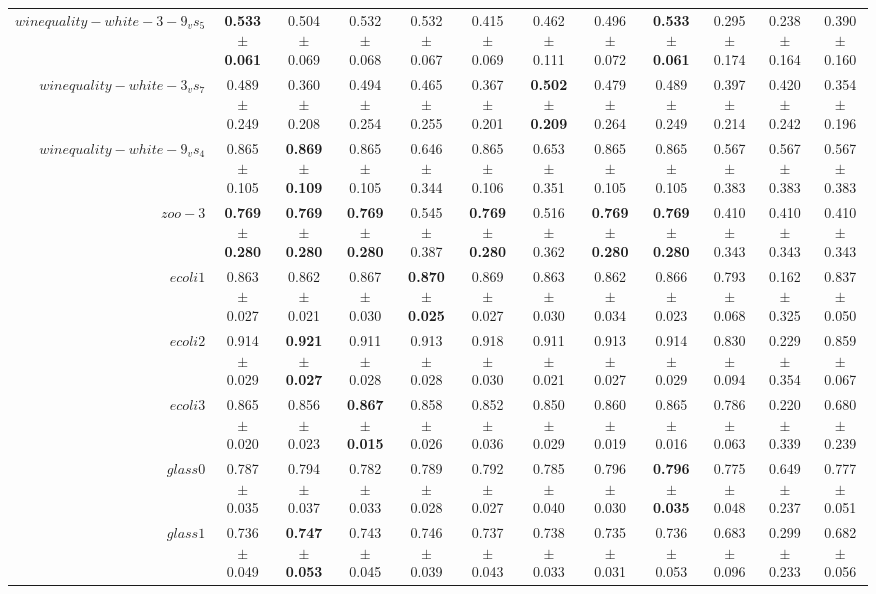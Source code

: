 \begin{table}[!ht]
{\begin{tabular}{r c c c c c c c c c c c}
$winequality-white-3-9_vs_5$ & \textbf{0.533 $\pm$ 0.061} & 0.504 $\pm$ 0.069 & 0.532 $\pm$ 0.068 & 0.532 $\pm$ 0.067 & 0.415 $\pm$ 0.069 & 0.462 $\pm$ 0.111 & 0.496 $\pm$ 0.072 & \textbf{0.533 $\pm$ 0.061} & 0.295 $\pm$ 0.174 & 0.238 $\pm$ 0.164 & 0.390 $\pm$ 0.160 \\
$winequality-white-3_vs_7$ & 0.489 $\pm$ 0.249 & 0.360 $\pm$ 0.208 & 0.494 $\pm$ 0.254 & 0.465 $\pm$ 0.255 & 0.367 $\pm$ 0.201 & \textbf{0.502 $\pm$ 0.209} & 0.479 $\pm$ 0.264 & 0.489 $\pm$ 0.249 & 0.397 $\pm$ 0.214 & 0.420 $\pm$ 0.242 & 0.354 $\pm$ 0.196 \\
$winequality-white-9_vs_4$ & 0.865 $\pm$ 0.105 & \textbf{0.869 $\pm$ 0.109} & 0.865 $\pm$ 0.105 & 0.646 $\pm$ 0.344 & 0.865 $\pm$ 0.106 & 0.653 $\pm$ 0.351 & 0.865 $\pm$ 0.105 & 0.865 $\pm$ 0.105 & 0.567 $\pm$ 0.383 & 0.567 $\pm$ 0.383 & 0.567 $\pm$ 0.383 \\
$zoo-3$ & \textbf{0.769 $\pm$ 0.280} & \textbf{0.769 $\pm$ 0.280} & \textbf{0.769 $\pm$ 0.280} & 0.545 $\pm$ 0.387 & \textbf{0.769 $\pm$ 0.280} & 0.516 $\pm$ 0.362 & \textbf{0.769 $\pm$ 0.280} & \textbf{0.769 $\pm$ 0.280} & 0.410 $\pm$ 0.343 & 0.410 $\pm$ 0.343 & 0.410 $\pm$ 0.343 \\
$ecoli1$ & 0.863 $\pm$ 0.027 & 0.862 $\pm$ 0.021 & 0.867 $\pm$ 0.030 & \textbf{0.870 $\pm$ 0.025} & 0.869 $\pm$ 0.027 & 0.863 $\pm$ 0.030 & 0.862 $\pm$ 0.034 & 0.866 $\pm$ 0.023 & 0.793 $\pm$ 0.068 & 0.162 $\pm$ 0.325 & 0.837 $\pm$ 0.050 \\
$ecoli2$ & 0.914 $\pm$ 0.029 & \textbf{0.921 $\pm$ 0.027} & 0.911 $\pm$ 0.028 & 0.913 $\pm$ 0.028 & 0.918 $\pm$ 0.030 & 0.911 $\pm$ 0.021 & 0.913 $\pm$ 0.027 & 0.914 $\pm$ 0.029 & 0.830 $\pm$ 0.094 & 0.229 $\pm$ 0.354 & 0.859 $\pm$ 0.067 \\
$ecoli3$ & 0.865 $\pm$ 0.020 & 0.856 $\pm$ 0.023 & \textbf{0.867 $\pm$ 0.015} & 0.858 $\pm$ 0.026 & 0.852 $\pm$ 0.036 & 0.850 $\pm$ 0.029 & 0.860 $\pm$ 0.019 & 0.865 $\pm$ 0.016 & 0.786 $\pm$ 0.063 & 0.220 $\pm$ 0.339 & 0.680 $\pm$ 0.239 \\
$glass0$ & 0.787 $\pm$ 0.035 & 0.794 $\pm$ 0.037 & 0.782 $\pm$ 0.033 & 0.789 $\pm$ 0.028 & 0.792 $\pm$ 0.027 & 0.785 $\pm$ 0.040 & 0.796 $\pm$ 0.030 & \textbf{0.796 $\pm$ 0.035} & 0.775 $\pm$ 0.048 & 0.649 $\pm$ 0.237 & 0.777 $\pm$ 0.051 \\
$glass1$ & 0.736 $\pm$ 0.049 & \textbf{0.747 $\pm$ 0.053} & 0.743 $\pm$ 0.045 & 0.746 $\pm$ 0.039 & 0.737 $\pm$ 0.043 & 0.738 $\pm$ 0.033 & 0.735 $\pm$ 0.031 & 0.736 $\pm$ 0.053 & 0.683 $\pm$ 0.096 & 0.299 $\pm$ 0.233 & 0.682 $\pm$ 0.056 \\

\end{tabular}}
\end{table}

